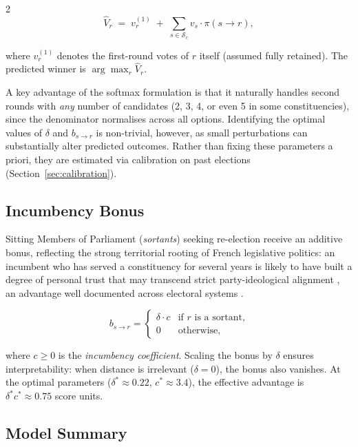 \documentclass[10pt, a4paper]{article}
\begin{document}
\begin{multicols}{2}
\begin{equation}
  \label{eq:pred}
  \hat{V}_r \;=\; v_r^{(1)} \;+\;
    \sum_{s \in \mathcal{S}_c} v_s \cdot \pi(s \to r),
\end{equation}

\noindent where $v_r^{(1)}$ denotes the first-round votes of $r$ itself
(assumed fully retained).
The predicted winner is $\arg\max_r \hat{V}_r$.

A key advantage of the softmax formulation is that it naturally handles
second rounds with \emph{any} number of candidates (2, 3, 4, or even 5 in
some constituencies), since the denominator normalises across all options.
Identifying the optimal values of $\delta$ and $b_{s\to r}$ is non-trivial,
however, as small perturbations can substantially alter predicted outcomes.
Rather than fixing these parameters a priori, they are estimated via
calibration on past elections (Section~\ref{sec:calibration}).

\subsection{Incumbency Bonus}
\label{sec:bonus}

Sitting Members of Parliament (\emph{sortants}) seeking re-election receive
an additive bonus, reflecting the strong territorial rooting of French
legislative politics: an incumbent who has served a constituency for several
years is likely to have built a degree of personal trust that may transcend
strict party-ideological alignment , an advantage well documented across
electoral systems \citep{gelman1990}.

\begin{equation}
  \label{eq:bonus}
  b_{s \to r} =
  \begin{cases}
    \delta \cdot c & \text{if } r \text{ is a sortant,} \\
    0              & \text{otherwise,}
  \end{cases}
\end{equation}

\noindent where $c \geq 0$ is the \emph{incumbency coefficient}.
Scaling the bonus by $\delta$ ensures interpretability: when distance is
irrelevant ($\delta = 0$), the bonus also vanishes.
At the optimal parameters ($\delta^*\approx 0.22$,\; $c^*\approx 3.4$),
the effective advantage is $\delta^* c^* \approx 0.75$ score units.

\subsection{Model Summary}


\end{multicols}
\end{document}
